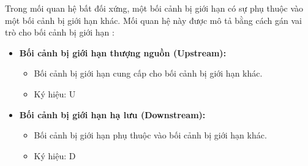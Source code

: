 

Trong mối quan hệ bất đối xứng, một bối cảnh bị giới hạn có sự phụ thuộc vào một bối cảnh bị giới hạn khác. Mối quan hệ này được mô tả bằng cách gán vai trò cho bối cảnh bị giới hạn :

\begin{itemize}

\item \textbf{Bối cảnh bị giới hạn thượng nguồn (Upstream):}

\begin{itemize}

\item Bối cảnh bị giới hạn cung cấp cho bối cảnh bị giới hạn khác.

\item Ký hiệu: U

\end{itemize}

\item \textbf{Bối cảnh bị giới hạn hạ lưu (Downstream):}

\begin{itemize}

\item Bối cảnh bị giới hạn phụ thuộc vào bối cảnh bị giới hạn khác.

\item Ký hiệu: D

\end{itemize}

\end{itemize}

